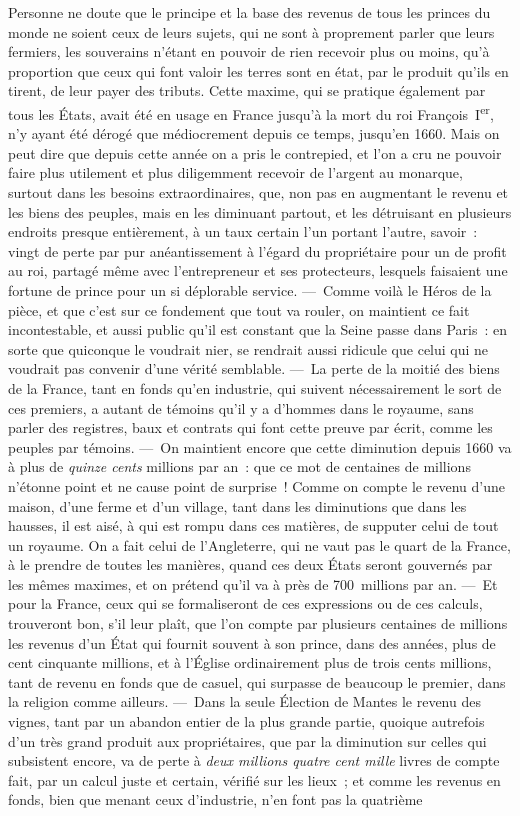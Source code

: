 \documentclass[french,twoside]{book} %
\begin{document}
Personne ne doute que le principe et la base des revenus de tous les princes du monde ne soient ceux de leurs sujets, qui ne sont à proprement parler que leurs fermiers, les souverains n’étant en pouvoir de rien recevoir plus ou moins, qu’à proportion que ceux qui font valoir les terres sont en état, par le produit qu’ils en tirent, de leur payer des tributs. Cette maxime, qui se pratique également par tous les États, avait été en usage en France jusqu’à la mort du roi François I\textsuperscript{er}, n’y ayant été dérogé que médiocrement depuis ce temps, jusqu’en 1660. Mais on peut dire que depuis cette année on a pris le contrepied, et l’on a cru ne pouvoir faire plus utilement et plus diligemment recevoir de l’argent au monarque, surtout dans les besoins extraordinaires, que, non pas en augmentant le revenu et les biens des peuples, mais en les diminuant partout, et les détruisant en plusieurs endroits presque entièrement, à un taux certain l’un portant l’autre, savoir : vingt de perte par pur anéantissement à l’égard du propriétaire pour un de profit au roi, partagé même avec l’entrepreneur et ses protecteurs, lesquels faisaient une fortune de prince pour un si déplorable service. — Comme voilà le Héros de la pièce, et que c’est sur ce fondement que tout va rouler, on maintient ce fait incontestable, et aussi public qu’il est constant que la Seine passe dans Paris : en sorte que quiconque le voudrait nier, se rendrait aussi ridicule que celui qui ne voudrait pas convenir d’une vérité semblable. — La perte de la moitié des biens de la France, tant en fonds qu’en industrie, qui suivent nécessairement le sort de ces premiers, a autant de témoins qu’il y a d’hommes dans le royaume, sans parler des registres, baux et contrats qui font cette preuve par écrit, comme les peuples par témoins. — On maintient encore que cette diminution depuis 1660 va à plus de {\itshape quinze cents} millions par an : que ce mot de centaines de millions n’étonne point et ne cause point de surprise ! Comme on compte le revenu d’une maison, d’une ferme et d’un village, tant dans les diminutions que dans les hausses, il est aisé, à qui est rompu dans ces matières, de supputer celui de tout un royaume. On a fait celui de l’Angleterre, qui ne vaut pas le quart de la France, à le prendre de toutes les manières, quand ces deux États seront gouvernés par les mêmes maximes, et on prétend qu’il va à près de 700 millions par an. — Et pour la France, ceux qui se formaliseront de ces expressions ou de ces calculs, trouveront bon, s’il leur plaît, que l’on compte par plusieurs centaines de millions les revenus d’un État qui fournit souvent à son prince, dans des années, plus de cent cinquante millions, et à l’Église ordinairement plus de trois cents millions, tant de revenu en fonds que de casuel, qui surpasse de beaucoup le premier, dans la religion comme ailleurs. — Dans la seule Élection de Mantes le revenu des vignes, tant par un abandon entier de la plus grande partie, quoique autrefois d’un très grand produit aux propriétaires, que par la diminution sur celles qui subsistent encore, va de perte à {\itshape deux millions quatre cent mille} livres de compte fait, par un calcul juste et certain, vérifié sur les lieux ; et comme les revenus en fonds, bien que menant ceux d’industrie, n’en font pas la quatrième 
\end{document}

